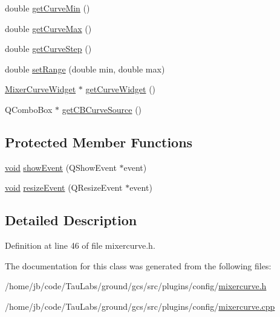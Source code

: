 \begin{DoxyCompactItemize}
double \hyperlink{group___config_plugin_gae8aad43963c9ca3ce7412e3f8f023e84}{get\-Curve\-Min} ()
\item 
double \hyperlink{group___config_plugin_ga00f0ef17d7a211c8cfa37feb02cc032c}{get\-Curve\-Max} ()
\item 
double \hyperlink{group___config_plugin_ga2f4e12f8e1036a490fe9846548bcb197}{get\-Curve\-Step} ()
\item 
double \hyperlink{group___config_plugin_ga7cd12492effe33f54cbbbc2eed7a5acb}{set\-Range} (double min, double max)
\item 
\hyperlink{class_mixer_curve_widget}{\-Mixer\-Curve\-Widget} $\ast$ \hyperlink{group___config_plugin_ga289025b567020147913c14fbdf51b3d6}{get\-Curve\-Widget} ()
\item 
\-Q\-Combo\-Box $\ast$ \hyperlink{group___config_plugin_ga8822c0ca3bfdc63eaa942da572b0b8af}{get\-C\-B\-Curve\-Source} ()
\end{DoxyCompactItemize}
\subsection*{\-Protected \-Member \-Functions}
\begin{DoxyCompactItemize}
\item 
\hyperlink{group___u_a_v_objects_plugin_ga444cf2ff3f0ecbe028adce838d373f5c}{void} \hyperlink{group___config_plugin_ga7ccd9c0dd214329e0801e42b6d2858b9}{show\-Event} (\-Q\-Show\-Event $\ast$event)
\item 
\hyperlink{group___u_a_v_objects_plugin_ga444cf2ff3f0ecbe028adce838d373f5c}{void} \hyperlink{group___config_plugin_gab7f43f88c7142be2694361b898a0bdc0}{resize\-Event} (\-Q\-Resize\-Event $\ast$event)
\end{DoxyCompactItemize}


\subsection{\-Detailed \-Description}


\-Definition at line 46 of file mixercurve.\-h.



\-The documentation for this class was generated from the following files\-:\begin{DoxyCompactItemize}
\item 
/home/jb/code/\-Tau\-Labs/ground/gcs/src/plugins/config/\hyperlink{mixercurve_8h}{mixercurve.\-h}\item 
/home/jb/code/\-Tau\-Labs/ground/gcs/src/plugins/config/\hyperlink{mixercurve_8cpp}{mixercurve.\-cpp}\end{DoxyCompactItemize}
